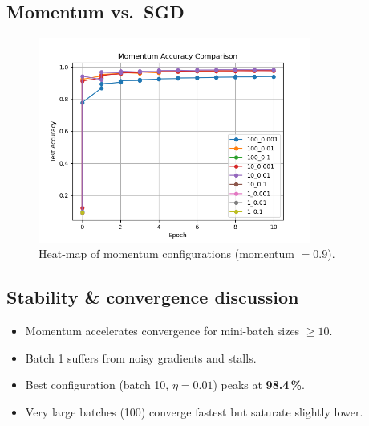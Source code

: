 \documentclass[11pt]{article}
\begin{document}
\subsection{Momentum vs.\ SGD}
\begin{figure}[H]
  \centering
  \includegraphics[width=0.8\textwidth]{../figures/compare_partII.png}
  \caption{Heat-map of momentum configurations (momentum $=0.9$).}
\end{figure}

\subsection{Stability \& convergence discussion}
\begin{itemize}
  \item Momentum accelerates convergence for mini-batch sizes $\geq10$.
  \item Batch 1 suffers from noisy gradients and stalls.
  \item Best configuration (batch 10, $\eta=0.01$) peaks at \textbf{98.4\,\%}.
  \item Very large batches (100) converge fastest but saturate slightly lower.
\end{itemize}
\end{document}
